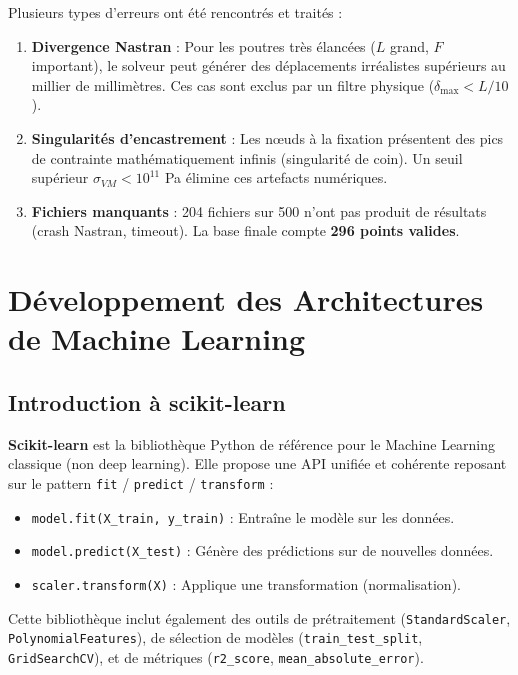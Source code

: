 \documentclass[journal, a4paper, twocolumn]{IEEEtran}
\begin{document}
Plusieurs types d'erreurs ont été rencontrés et traités :
\begin{enumerate}
    \item \textbf{Divergence Nastran} : Pour les poutres très élancées ($L$ grand, $F$ important), le solveur peut générer des déplacements irréalistes supérieurs au millier de millimètres. Ces cas sont exclus par un filtre physique ($\delta_{\max} < L/10$).
    \item \textbf{Singularités d'encastrement} : Les nœuds à la fixation présentent des pics de contrainte mathématiquement infinis (singularité de coin). Un seuil supérieur $\sigma_{VM} < 10^{11}$ Pa élimine ces artefacts numériques.
    \item \textbf{Fichiers manquants} : 204 fichiers sur 500 n'ont pas produit de résultats (crash Nastran, timeout). La base finale compte \textbf{296 points valides}.
\end{enumerate}

\section{Développement des Architectures de Machine Learning}

\subsection{Introduction à scikit-learn}

\textbf{Scikit-learn} est la bibliothèque Python de référence pour le Machine Learning classique (non deep learning). Elle propose une API unifiée et cohérente reposant sur le pattern \texttt{fit} / \texttt{predict} / \texttt{transform} :
\begin{itemize}
    \item \texttt{model.fit(X\_train, y\_train)} : Entraîne le modèle sur les données.
    \item \texttt{model.predict(X\_test)} : Génère des prédictions sur de nouvelles données.
    \item \texttt{scaler.transform(X)} : Applique une transformation (normalisation).
\end{itemize}

Cette bibliothèque inclut également des outils de prétraitement (\texttt{StandardScaler}, \texttt{PolynomialFeatures}), de sélection de modèles (\texttt{train\_test\_split}, \texttt{GridSearchCV}), et de métriques (\texttt{r2\_score}, \texttt{mean\_absolute\_error}).
\end{document}

